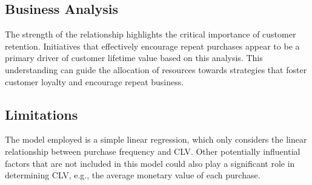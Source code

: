 \documentclass[
]{article}
\begin{document}
\subsection{Business Analysis}\label{business-analysis}

The strength of the relationship highlights the critical importance of
customer retention. Initiatives that effectively encourage repeat
purchases appear to be a primary driver of customer lifetime value based
on this analysis. This understanding can guide the allocation of
resources towards strategies that foster customer loyalty and encourage
repeat business.

\subsection{Limitations}\label{limitations}

The model employed is a simple linear regression, which only considers
the linear relationship between purchase frequency and CLV. Other
potentially influential factors that are not included in this model
could also play a significant role in determining CLV, e.g., the average
monetary value of each purchase.
\end{document}
